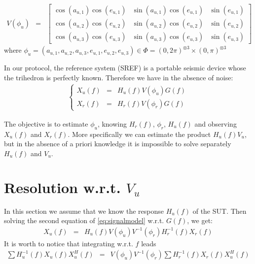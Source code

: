 \documentclass[a4paper, 12pt]{report}
\begin{document}
\begin{eqnarray}
\label{eq:parametricformofV}
V(\phi_{u})&=&
\begin{bmatrix}
\cos(a_{u,1})\cos(e_{u,1})&\sin(a_{u,1})\cos(e_{u,1})&\sin(e_{u,1})
\\
\cos(a_{u,2})\cos(e_{u,2})&\sin(a_{u,2})\cos(e_{u,2})&\sin(e_{u,2})
\\
\cos(a_{u,3})\cos(e_{u,3})&\sin(a_{u,3})\cos(e_{u,3})&\sin(e_{u,3})
\end{bmatrix}
\end{eqnarray}
where $\phi_{u}=(a_{u,1},a_{u,2},a_{u,3},e_{u,1},e_{u,2},e_{u,3})\in\Phi= (0,2\pi)^{\otimes 3}\times (0,\pi)^{\otimes 3}$

In our protocol, the  reference system (SREF) is a portable seismic device whose the trihedron  is perfectly known. 
Therefore we have in the absence of noise:
\begin{eqnarray}
\label{eq:signalmodel}
\left\{
\begin{array}{rcl}
X_{u}(f)&=&H_{u}(f)V(\phi_{u})G(f)
\\
X_{r}(f)&=&H_{r}(f)V(\phi_{r})G(f)
\end{array}
\right.
\end{eqnarray}

The objective is to estimate $\phi_{u}$, knowing $H_{r}(f)$,  $\phi_{r}$, $H_{u}(f)$ and observing $X_{u}(f)$ and $X_{r}(f)$.
More specifically we can estimate the product $H_{u}(f)V_{u}$, but in the absence of a priori knowledge it is impossible to solve separately $H_{u}(f)$ and $V_{u}$.


\section{Resolution w.r.t. $V_{u}$}
In this section we assume that we know the response $H_{u}(f)$ of the SUT. Then solving the second equation of \eqref{eq:signalmodel} w.r.t. $G(f)$, we get:
\begin{eqnarray*}
X_{u}(f)&=&H_{u}(f)V(\phi_{u})V ^{-1}(\phi_{r})H_{r}^{-1}(f)X_{r}(f)
\end{eqnarray*}
It is worth to notice that integrating w.r.t. $f$ leads
\begin{eqnarray*}
\sum H_{u}^{-1}(f)X_{u}(f)X_{u}^{H}(f)&=&V(\phi_{u})V^{-1}(\phi_{r})\sum H_{r}^{-1}(f)X_{r}(f)X_{u}^{H}(f)
\end{eqnarray*}
\end{document}
